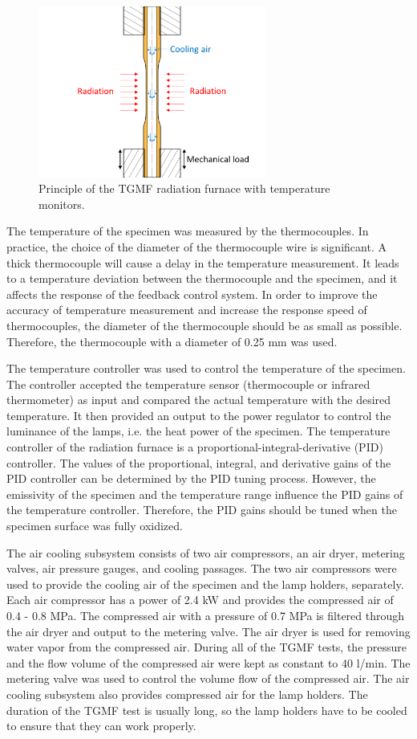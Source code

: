 \documentclass[preprint,5p,twocolumn,10pt,sort&compress]{elsarticle}
\begin{document}
\begin{figure}[!ht]
    \centering
    \includegraphics[width=7.5cm]{cooling.png}
    \caption{Principle of the TGMF radiation furnace with temperature monitors.}
    \label{Fig:cooling}
\end{figure}

The temperature of the specimen was measured by the thermocouples. In practice, the choice of the diameter of the thermocouple wire is significant. A thick thermocouple will cause a delay in the temperature measurement. It leads to a temperature deviation between the thermocouple and the specimen, and it affects the response of the feedback control system. In order to improve the accuracy of temperature measurement and increase the response speed of thermocouples, the diameter of the thermocouple should be as small as possible. Therefore, the thermocouple with a diameter of 0.25 mm was used.

The temperature controller was used to control the temperature of the specimen.
The controller accepted the temperature sensor (thermocouple or infrared thermometer) as input and compared the actual temperature with the desired temperature. It then provided an output to the power regulator to control the luminance of the lamps, i.e. the heat power of the specimen. 
The temperature controller of the radiation furnace is a proportional-integral-derivative (PID) controller. The values of the proportional, integral, and derivative gains of the PID controller can be determined by the PID tuning process.
However, the emissivity of the specimen and the temperature range influence the PID gains of the temperature controller. Therefore, the PID gains should be tuned when the specimen surface was fully oxidized.

The air cooling subsystem consists of two air compressors, an air dryer, metering valves, air pressure gauges, and cooling passages. 
The two air compressors were used to provide the cooling air of the specimen and the lamp holders, separately.
Each air compressor has a power of 2.4 kW and provides the compressed air of 0.4 - 0.8 MPa. The compressed air with a pressure of 0.7 MPa is filtered through the air dryer and output to the metering valve. The air dryer is used for removing water vapor from the compressed air.
During all of the TGMF tests, the pressure and the flow volume of the compressed air were kept as constant to 40 l/min. The metering valve was used to control the volume flow of the compressed air.
The air cooling subsystem also provides compressed air for the lamp holders.
The duration of the TGMF test is usually long, so the lamp holders have to be cooled to ensure that they can work properly.
\end{document}
